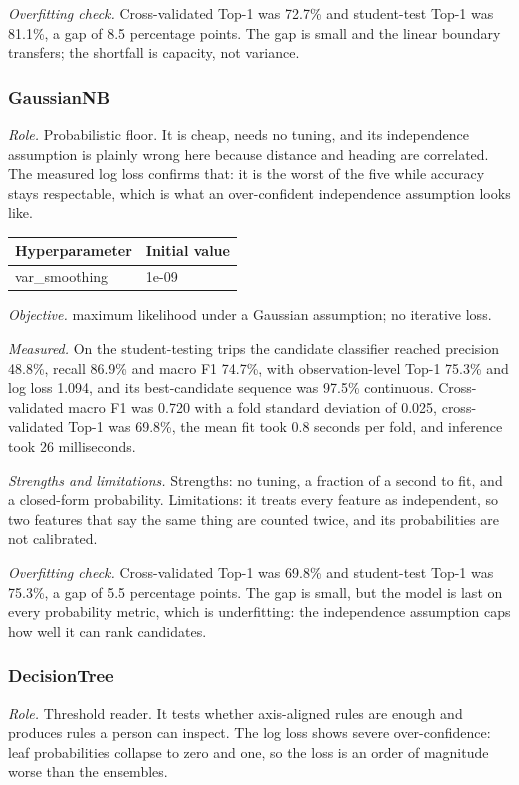 \documentclass[11pt,a4paper]{article}
\begin{document}
\noindent\textit{Overfitting check.} Cross-validated Top-1 was 72.7\% and student-test Top-1 was 81.1\%, a gap of 8.5 percentage points. The gap is small and the linear boundary transfers; the shortfall is capacity, not variance.

\subsubsection*{GaussianNB}
\noindent\textit{Role.} Probabilistic floor. It is cheap, needs no tuning, and its independence assumption is plainly wrong here because distance and heading are correlated. The measured log loss confirms that: it is the worst of the five while accuracy stays respectable, which is what an over-confident independence assumption looks like.

\begin{center}\small\begin{tabular}{@{}ll@{}}\toprule\textbf{Hyperparameter} & \textbf{Initial value} \\ \midrule
var\_smoothing & 1e-09 \\
\bottomrule\end{tabular}\end{center}

\noindent\textit{Objective.} maximum likelihood under a Gaussian assumption; no iterative loss.

\noindent\textit{Measured.} On the student-testing trips the candidate classifier reached precision 48.8\%, recall 86.9\% and macro F1 74.7\%, with observation-level Top-1 75.3\% and log loss 1.094, and its best-candidate sequence was 97.5\% continuous. Cross-validated macro F1 was 0.720 with a fold standard deviation of 0.025, cross-validated Top-1 was 69.8\%, the mean fit took 0.8 seconds per fold, and inference took 26 milliseconds.

\noindent\textit{Strengths and limitations.} Strengths: no tuning, a fraction of a second to fit, and a closed-form probability. Limitations: it treats every feature as independent, so two features that say the same thing are counted twice, and its probabilities are not calibrated.

\noindent\textit{Overfitting check.} Cross-validated Top-1 was 69.8\% and student-test Top-1 was 75.3\%, a gap of 5.5 percentage points. The gap is small, but the model is last on every probability metric, which is underfitting: the independence assumption caps how well it can rank candidates.

\subsubsection*{DecisionTree}
\noindent\textit{Role.} Threshold reader. It tests whether axis-aligned rules are enough and produces rules a person can inspect. The log loss shows severe over-confidence: leaf probabilities collapse to zero and one, so the loss is an order of magnitude worse than the ensembles.
\end{document}
